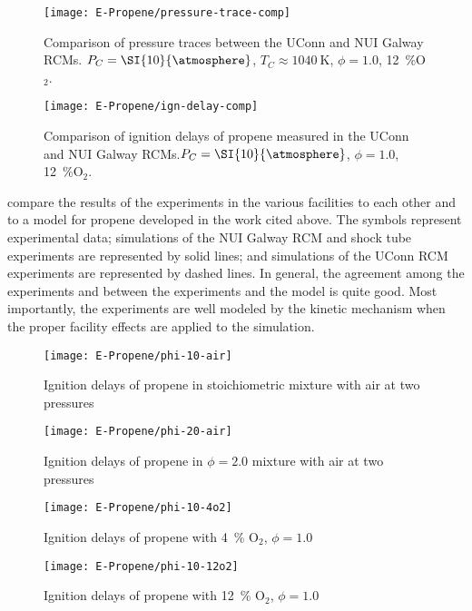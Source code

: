 \documentclass[../main.tex]{subfiles}
\begin{document}
\begin{figure}
    \begin{floatrow}
        \ffigbox
            {\texttt{[image: E-Propene/pressure-trace-comp]}}
            {\caption{Comparison of pressure traces between the UConn and
            NUI Galway RCMs. $P_C=\SI{10}{\atmosphere}$, $T_C\approx\SI{1040}{\kelvin}$,
            $\phi=1.0$, \SI{12}{\percent}O$_2$.}
            \label{fig:pressure-trace-comp}}
        \ffigbox
            {\texttt{[image: E-Propene/ign-delay-comp]}}
            {\caption{Comparison of ignition delays of propene measured
            in the UConn and NUI Galway RCMs.$P_C=\SI{10}{\atmosphere}$,
            $\phi=1.0$, \SI{12}{\percent}O$_2$.}
            \label{fig:ign-delay-comp}}
    \end{floatrow}
\end{figure}

 compare the results of the experiments in the
various facilities to each other and to a model for propene developed
in the work cited above. The symbols represent experimental data; simulations
of the NUI Galway RCM and shock tube experiments are represented by solid lines;
and simulations of the UConn RCM experiments are represented by dashed lines.
In general, the agreement among the experiments and between the experiments
and the model is quite good. Most importantly, the experiments are well
modeled by the kinetic mechanism when the proper facility effects are
applied to the simulation.

\begin{figure}
    \begin{floatrow}
        \ffigbox
            {\texttt{[image: E-Propene/phi-10-air]}}
            {\caption{Ignition delays of propene in stoichiometric
            mixture with air at two pressures}
            \label{fig:phi-10-air}}
        \ffigbox
            {\texttt{[image: E-Propene/phi-20-air]}}
            {\caption{Ignition delays of propene in $\phi=2.0$
            mixture with air at two pressures}
            \label{fig:phi-20-air}}
    \end{floatrow}
\end{figure}

\begin{figure}
    \begin{floatrow}
        \ffigbox
            {\texttt{[image: E-Propene/phi-10-4o2]}}
            {\caption{Ignition delays of propene with \SI{4}{\percent}
            O$_2$, $\phi=1.0$}
            \label{fig:phi-10-4o2}}
        \ffigbox
            {\texttt{[image: E-Propene/phi-10-12o2]}}
            {\caption{Ignition delays of propene with \SI{12}{\percent}
            O$_2$, $\phi=1.0$}
            \label{fig:phi-10-12o2}}
    \end{floatrow}
\end{figure}
\end{document}
